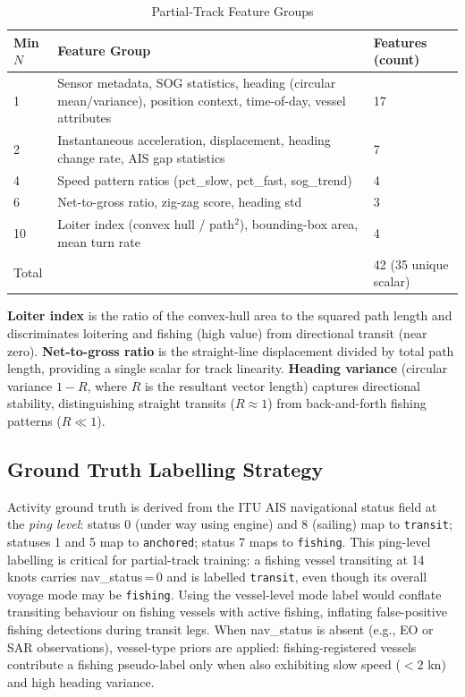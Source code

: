 \documentclass[journal]{IEEEtran}
\begin{document}
\begin{table}[!t]
  \caption{Partial-Track Feature Groups}
  \label{tab:features}
  \centering
  \begin{tabular}{p{1.2cm}p{3.5cm}p{2.3cm}}
    \toprule
    Min $N$ & Feature Group & Features (count) \\
    \midrule
    1 & Sensor metadata, SOG statistics, heading (circular mean/variance), position context, time-of-day, vessel attributes & 17 \\
    2 & Instantaneous acceleration, displacement, heading change rate, AIS gap statistics & 7 \\
    4 & Speed pattern ratios (pct\_slow, pct\_fast, sog\_trend) & 4 \\
    6 & Net-to-gross ratio, zig-zag score, heading std & 3 \\
    10 & Loiter index (convex hull / path$^2$), bounding-box area, mean turn rate & 4 \\
    \midrule
    \multicolumn{2}{l}{Total} & 42 (35 unique scalar) \\
    \bottomrule
  \end{tabular}
\end{table}

\textbf{Loiter index} is the ratio of the convex-hull area to the squared
path length and discriminates loitering and fishing (high value) from
directional transit (near zero).
%
\textbf{Net-to-gross ratio} is the straight-line displacement divided by
total path length, providing a single scalar for track linearity.
%
\textbf{Heading variance} (circular variance $1 - R$, where $R$ is the
resultant vector length) captures directional stability, distinguishing
straight transits ($R \approx 1$) from back-and-forth fishing patterns
($R \ll 1$).

\subsection{Ground Truth Labelling Strategy}

Activity ground truth is derived from the ITU AIS navigational status
field at the \emph{ping level}: status 0 (under way using engine) and 8
(sailing) map to \texttt{transit}; statuses 1 and 5 map to
\texttt{anchored}; status 7 maps to \texttt{fishing}.
%
This ping-level labelling is critical for partial-track training: a
fishing vessel transiting at 14 knots carries nav\_status\,=\,0 and is
labelled \texttt{transit}, even though its overall voyage mode may be
\texttt{fishing}.
%
Using the vessel-level mode label would conflate transiting behaviour on
fishing vessels with active fishing, inflating false-positive fishing
detections during transit legs.
%
When nav\_status is absent (e.g., EO or SAR observations), vessel-type
priors are applied: fishing-registered vessels contribute a fishing
pseudo-label only when also exhibiting slow speed ($<2$ kn) and high
heading variance.
\end{document}

